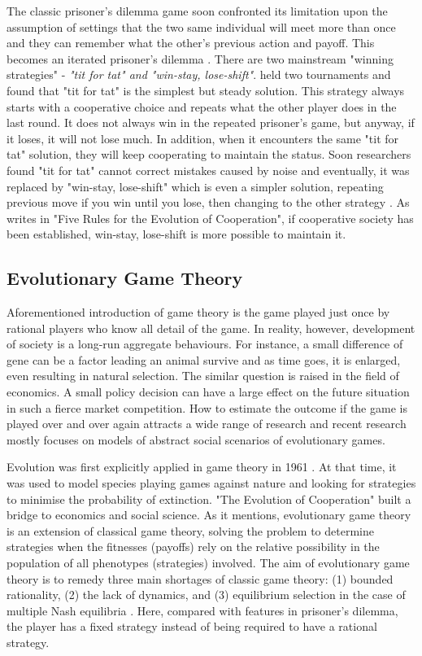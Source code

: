 The classic prisoner's dilemma game soon confronted its limitation upon the assumption of settings that the two same individual will meet more than once and they can remember what the other's previous action and payoff. This becomes an iterated prisoner's dilemma \citep{axelrod1987evolution}. There are two mainstream "winning strategies" - \textit{"tit for tat" and "win-stay, lose-shift"}. \citet{axelrod2006evolution} held two tournaments and found that "tit for tat" is the simplest but steady solution. This strategy always starts with a cooperative choice and repeats what the other player does in the last round. It does not always win in the repeated prisoner's game, but anyway, if it loses, it will not lose much. In addition, when it encounters the same "tit for tat" solution, they will keep cooperating to maintain the status. Soon researchers found "tit for tat" cannot correct mistakes caused by noise and eventually, it was replaced by "win-stay, lose-shift" which is even a simpler solution, repeating previous move if you win until you lose, then changing to the other strategy \citep{nowak1993strategy}. As \citet{nowak2006five} writes in "Five Rules for the Evolution of Cooperation", if cooperative society has been established, win-stay, lose-shift is more possible to maintain it.

\subsection{Evolutionary Game Theory}
Aforementioned introduction of game theory is the game played just once by rational players who know all detail of the game. In reality, however, development of society is a long-run aggregate behaviours. For instance, a small difference of gene can be a factor leading an animal survive and as time goes, it is enlarged, even resulting in natural selection. The similar question is raised in the field of economics. A small policy decision can have a large effect on the future situation in such a fierce market competition. How to estimate the outcome if the game is played over and over again attracts a wide range of research and recent research mostly focuses on models of abstract social scenarios of evolutionary games.

Evolution was first explicitly applied in game theory in 1961 \citep{smith1982evolution}. At that time, it was used to model species playing games against nature and looking for strategies to minimise the probability of extinction. "The Evolution of Cooperation" \citep{axelrod2006evolution} built a bridge to economics and social science. As it mentions, evolutionary game theory is an extension of classical game theory, solving the problem to determine strategies when the fitnesses (payoffs) rely on the relative possibility in the population of all phenotypes (strategies) involved. The aim of evolutionary game theory is to remedy three main shortages of classic game theory: (1) bounded rationality, (2) the lack of dynamics, and (3) equilibrium selection in the case of multiple Nash equilibria \citep{szabo2007evolutionary}. Here, compared with features in prisoner's dilemma, the player has a fixed strategy instead of being required to have a rational strategy.

